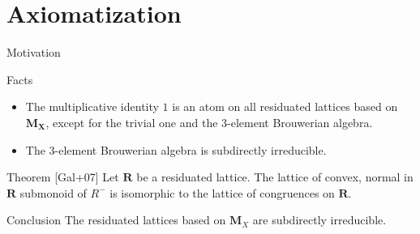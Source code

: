 \documentclass[professionalfont, 10pt]{beamer} %
\theoremstyle{plain}
\theoremstyle{definition}
\newcommand{\m}[1]{{\mathbf {#1} }}
\begin{document}
\section{Axiomatization}

\begin{frame}{Motivation}

\begin{block}{Facts}
    \begin{itemize}
        \item The multiplicative identity $1$ is an atom on all residuated lattices based on $\mathbf{M_X}$, except for the trivial one and the $3$-element Brouwerian algebra.

        \item The $3$-element Brouwerian algebra is subdirectly irreducible.
    \end{itemize}
\end{block}

\begin{block}{Theorem [Gal+07]}
    Let $\m R$ be a residuated lattice.
    The lattice of convex, normal in $\m R$ submonoid of $R^-$ is isomorphic to the lattice of congruences on $\m R$.
\end{block}

\pause

\begin{block}{Conclusion}
    The residuated lattices based on $\m M_X$ are subdirectly irreducible.
\end{block}
\end{frame}
\end{document}
